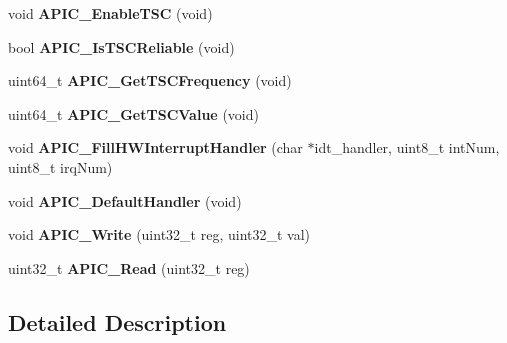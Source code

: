 \begin{DoxyCompactItemize}
\item 
void {\bfseries A\+P\+I\+C\+\_\+\+Enable\+T\+SC} (void)\hypertarget{group__apic__driver_gaed3960e88abda2285b6a479e122dd4e1}{}\label{group__apic__driver_gaed3960e88abda2285b6a479e122dd4e1}

\item 
bool {\bfseries A\+P\+I\+C\+\_\+\+Is\+T\+S\+C\+Reliable} (void)\hypertarget{group__apic__driver_gacfd52bc42c90d0f92d9d5df98a0f3be1}{}\label{group__apic__driver_gacfd52bc42c90d0f92d9d5df98a0f3be1}

\item 
uint64\+\_\+t {\bfseries A\+P\+I\+C\+\_\+\+Get\+T\+S\+C\+Frequency} (void)\hypertarget{group__apic__driver_ga7b169ac31f60b800b2aad2f699b51123}{}\label{group__apic__driver_ga7b169ac31f60b800b2aad2f699b51123}

\item 
uint64\+\_\+t {\bfseries A\+P\+I\+C\+\_\+\+Get\+T\+S\+C\+Value} (void)\hypertarget{group__apic__driver_ga3b4fca2ff532a340fd670e2863cc3950}{}\label{group__apic__driver_ga3b4fca2ff532a340fd670e2863cc3950}

\item 
void {\bfseries A\+P\+I\+C\+\_\+\+Fill\+H\+W\+Interrupt\+Handler} (char $\ast$idt\+\_\+handler, uint8\+\_\+t int\+Num, uint8\+\_\+t irq\+Num)\hypertarget{group__apic__driver_gad534b011f0be1a2bc92ca552c5e3d90a}{}\label{group__apic__driver_gad534b011f0be1a2bc92ca552c5e3d90a}

\item 
void {\bfseries A\+P\+I\+C\+\_\+\+Default\+Handler} (void)\hypertarget{group__apic__driver_ga577398abb1adcdaf0c77ad124d5f9940}{}\label{group__apic__driver_ga577398abb1adcdaf0c77ad124d5f9940}

\item 
void {\bfseries A\+P\+I\+C\+\_\+\+Write} (uint32\+\_\+t reg, uint32\+\_\+t val)\hypertarget{group__apic__driver_ga70a474708d81ea1ec3f782ce49940070}{}\label{group__apic__driver_ga70a474708d81ea1ec3f782ce49940070}

\item 
uint32\+\_\+t {\bfseries A\+P\+I\+C\+\_\+\+Read} (uint32\+\_\+t reg)\hypertarget{group__apic__driver_ga966b47f2cc3b16779460871da1027150}{}\label{group__apic__driver_ga966b47f2cc3b16779460871da1027150}

\end{DoxyCompactItemize}


\subsection{Detailed Description}
